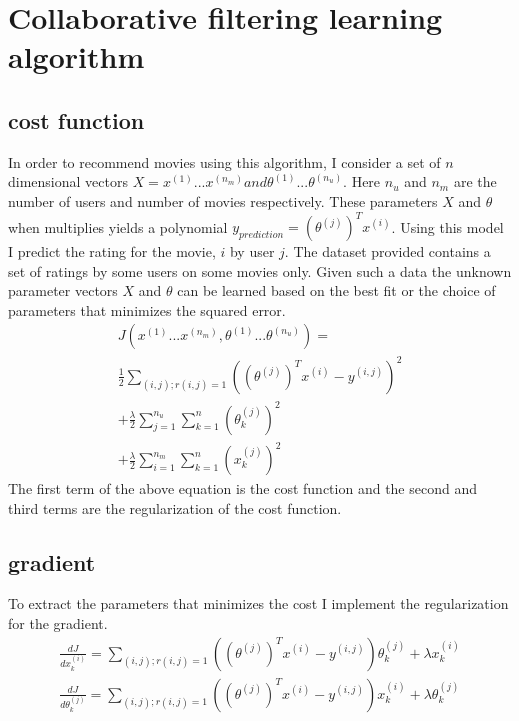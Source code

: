 \documentclass[twocolumn]{article}
\begin{document}
\section{Collaborative filtering learning algorithm}
\subsection{cost function}
In order to recommend movies using this algorithm, I consider a set of $n$ dimensional vectors $X = x^{(1)}...x^{(n_m)} and \theta^{(1)}...\theta^{(n_u)}$. Here $n_u$ and $n_m$ are the number of users and number of movies respectively. These parameters $X$ and $\theta$ when multiplies yields a polynomial $y_{prediction} = (\theta^(j))^Tx^{(i)}$. Using this model I predict the rating for the movie, $i$ by user $j$. The dataset provided contains a set of ratings by some users on some movies only. Given such a data the unknown parameter vectors $X$ and $\theta$ can be learned based on the best fit or the choice of parameters that minimizes the squared error.
\begin{align*}
	J(x^{(1)}...x^{(n_m)}, \theta^{(1)}...\theta^{(n_u)}) = \\\frac{1}{2}\sum_{(i,j);r(i,j)=1} ((\theta^(j))^Tx^{(i)} - y^{(i,j)})^2  \\+ \frac{\lambda}{2}\sum_{j=1}^{n_u}\sum_{k=1}^{n}(\theta_k^{(j)})^2 \\+ \frac{\lambda}{2}\sum_{i=1}^{n_m}\sum_{k=1}^{n}(x_k^{(j)})^2
\end{align*}
The first term of the above equation is the cost function and the second and third terms are the regularization of the cost function.
\subsection{gradient}
To extract the parameters that minimizes the cost I implement the regularization for the gradient.
\begin{align*}
	\frac{dJ}{dx_k^{(i)}} = \sum_{(i,j);r(i,j)=1} ((\theta^(j))^Tx^{(i)} - y^{(i,j)})\theta_k^{(j)} + \lambda x_k^{(i)}\\
	\frac{dJ}{d\theta_k^{(j)}} = \sum_{(i,j);r(i,j)=1} ((\theta^(j))^Tx^{(i)} - y^{(i,j)})x_k^{(i)} + \lambda \theta_k^{(j)}\\
\end{align*}
\end{document}
